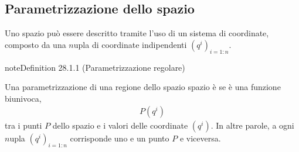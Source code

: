 \documentclass[letterpaper,10pt,italian]{jupyterBook}
\begin{document}
\subsection{Parametrizzazione dello spazio}
\label{\detokenize{ch/vector-calculus/geometry:parametrizzazione-dello-spazio}}\label{\detokenize{ch/vector-calculus/geometry:vector-calculus-geometry-coordinates}}
\sphinxAtStartPar
Uno spazio può essere descritto tramite l’uso di un sistema di coordinate, composto da una \(n\)\sphinxhyphen{}upla di coordinate indipendenti \(\left( q^i \right)_{i = 1:n}\).
\label{ch/vector-calculus/geometry:definition-0}
\begin{sphinxadmonition}{note}{Definition 28.1.1 (Parametrizzazione regolare)}



\sphinxAtStartPar
Una parametrizzazione di una regione dello spazio spazio è  se è una funzione biunivoca,
\begin{equation*}
\begin{split}P\left(q^i \right)\end{split}
\end{equation*}
\sphinxAtStartPar
tra i punti \(P\) dello spazio e i valori delle coordinate \(\left( q^i \right)\). In altre parole, a ogni \(n\)\sphinxhyphen{}upla \(\left( q^i \right)_{i=1:n}\) corrisponde uno e un punto \(P\) e viceversa.
\end{sphinxadmonition}
\end{document}
